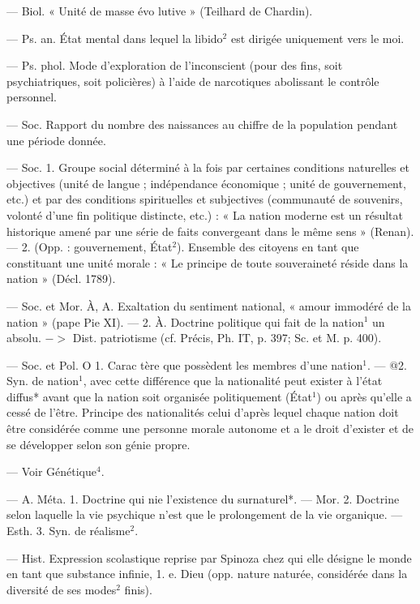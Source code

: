 	\begin{itemize}[leftmargin=1cm, label=, itemsep=1pt]
 — Biol. « Unité de masse évo
lutive » (Teilhard de Chardin).

 — Ps. an. État mental
dans lequel la libido$^2$ est dirigée
uniquement vers le moi.

 — Ps. phol. Mode
d'exploration de l’inconscient (pour
des fins, soit psychiatriques, soit
policières) à l’aide de narcotiques
abolissant le contrôle personnel.

 — Soc. Rapport du nombre
des naissances au chiffre de la
population pendant une période
donnée.

 — Soc. 1. Groupe social déterminé à la fois par certaines conditions naturelles et objectives (unité
de langue ; indépendance économique ; unité de gouvernement, etc.) et
par des conditions spirituelles et
subjectives (communauté de souvenirs, volonté d’une fin politique
distincte, etc.) : « La nation moderne est un résultat historique
amené par une série de faits convergeant dans le même sens » (Renan).
— 2. (Opp. : gouvernement, État$^2$).
Ensemble des citoyens en tant que
constituant une unité morale : « Le
principe de toute souveraineté réside dans la nation » (Décl. 1789).

 — Soc. et Mor. À, A.
Exaltation du sentiment national,
« amour immodéré de la nation »
(pape Pie XI). — 2. À. Doctrine politique qui fait de la nation$^1$ un
absolu. $->$ Dist. patriotisme (cf.
Précis, Ph. IT, p. 397; Sc. et M.
p. 400).

 — Soc. et Pol. O 1. Carac
tère que possèdent les membres
d’une nation$^1$. — @2. Syn. de nation$^1$,
avec cette différence que la nationalité peut exister à l’état diffus*
avant que la nation soit organisée
politiquement (État$^1$) ou après
qu’elle a cessé de l’être. Principe des
nationalités celui d’après lequel
chaque nation doit être considérée
comme une personne morale autonome et a le droit d’exister et de se
développer selon son génie propre.

 — Voir Génétique$^4$.

 — A. Méta. 1. Doctrine
qui nie l'existence du surnaturel*.
— Mor. 2. Doctrine selon laquelle
la vie psychique n’est que le prolongement de la vie organique. —
Esth. 3. Syn. de réalisme$^2$.

 — Hist. Expression scolastique reprise par Spinoza
chez qui elle désigne le monde en
tant que substance infinie, 1. e. Dieu
(opp. nature naturée, considérée dans
la diversité de ses modes$^2$ finis).


\end{itemize}
